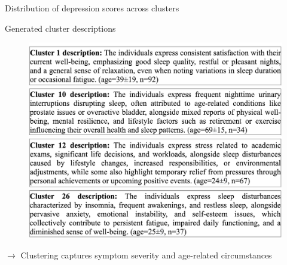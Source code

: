 \documentclass[handout,10pt]{beamer}
\begin{document}
\begin{frame}{Distribution of depression scores across clusters}
\end{frame}

\begin{frame}{Generated cluster descriptions}
  \begin{figure}
    \centering
    \includegraphics[scale=0.25]{img/topic_modeling/boxplot_description/popgen_description_larger_descriptions.png}
    \label{fig:popgen_description}
\end{figure}

\pause

$\rightarrow$ Clustering captures symptom severity and age-related circumstances

\end{frame}
\end{document}
